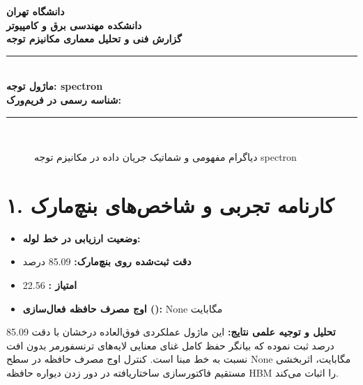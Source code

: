\documentclass[12pt,a4paper]{article}
\begin{document}
\begin{center}
{\Large\bfseries دانشگاه تهران}\\[0.2cm]
{\large\bfseries دانشکده مهندسی برق و کامپیوتر}\\[0.2cm]
{\large\bfseries گزارش فنی و تحلیل معماری مکانیزم توجه}\\[0.5cm]
\rule{\linewidth}{1pt}\\[0.3cm]
{\LARGE\bfseries ماژول توجه: spectron}\\[0.2cm]
{\large \textbf{شناسه رسمی در فریم‌ورک:} }\\[0.2cm]
\rule{\linewidth}{1pt}\\[0.5cm]
\end{center}

\begin{figure}[H]
\centering
{}
\caption{دیاگرام مفهومی و شماتیک جریان داده در مکانیزم توجه spectron}
\end{figure}

\section*{۱. کارنامه تجربی و شاخص‌های بنچ‌مارک}
\begin{itemize}
\item \textbf{وضعیت ارزیابی در خط لوله:} 
\item \textbf{دقت ثبت‌شده روی بنچ‌مارک:} 85.09 درصد
\item \textbf{امتیاز :} 22.56
\item \textbf{اوج مصرف حافظه فعال‌سازی ():} None مگابایت
\end{itemize}
\textbf{تحلیل و توجیه علمی نتایج:} این ماژول عملکردی فوق‌العاده درخشان با دقت 85.09 درصد ثبت نموده که بیانگر حفظ کامل غنای معنایی لایه‌های ترنسفورمر بدون افت نسبت به خط مبنا است. کنترل اوج مصرف حافظه در سطح None مگابایت، اثربخشی مستقیم فاکتورسازی ساختاریافته در دور زدن دیواره حافظه HBM را اثبات می‌کند.
\end{document}
